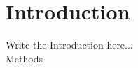 
\chapter{Introduction}
\label{chap:introduction}
\ifpdf
    \graphicspath{{Introduction/Figures/PNG/}{Introduction/Figures/PDF/}{Introduction/Figures/}}
\else
    \graphicspath{{Introduction/Figures/EPS/}{Introduction/Figures/}}
\fi

Write the Introduction here...\\

Methods\\

